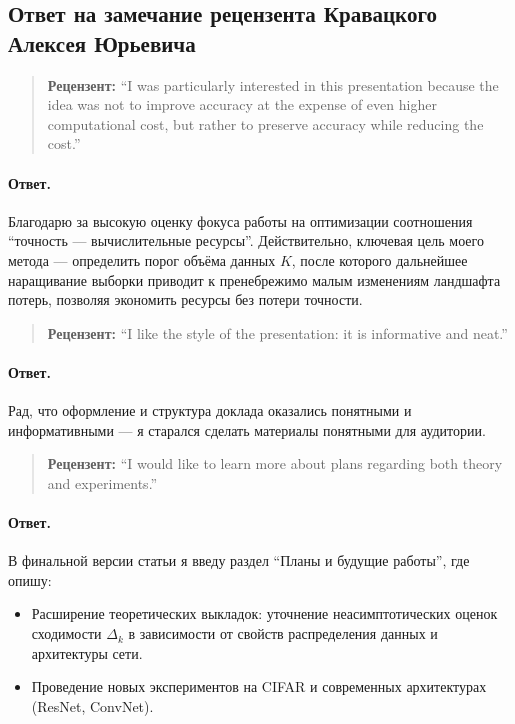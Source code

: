 \documentclass[11pt]{article}
\begin{document}
\pagestyle{empty}

\begin{center}
    \subsection*{Ответ на замечание рецензента Кравацкого Алексея Юрьевича}
\end{center}

\begin{quote}
    \textbf{Рецензент:}
    ``I was particularly interested in this presentation because the idea was not to improve accuracy at the expense of even
    higher computational cost, but rather to preserve accuracy while reducing the cost.''
\end{quote}

\paragraph{Ответ.}
Благодарю за высокую оценку фокуса работы на оптимизации соотношения ``точность --- вычислительные ресурсы''. Действительно,
ключевая цель моего метода — определить порог объёма данных $K$, после которого дальнейшее наращивание выборки приводит к
пренебрежимо малым изменениям ландшафта потерь, позволяя экономить ресурсы без потери точности.

\begin{quote}
    \textbf{Рецензент:}
    ``I like the style of the presentation: it is informative and neat.''
\end{quote}

\paragraph{Ответ.}
Рад, что оформление и структура доклада оказались понятными и информативными --- я старался сделать материалы понятными
для аудитории.

\begin{quote}
    \textbf{Рецензент:}
    ``I would like to learn more about plans regarding both theory and experiments.''
\end{quote}

\paragraph{Ответ.}
В финальной версии статьи я введу раздел ``Планы и будущие работы'', где опишу:
\begin{itemize}
    \item Расширение теоретических выкладок: уточнение неасимптотических оценок сходимости $\Delta_k$ в зависимости от
          свойств распределения данных и архитектуры сети.
    \item Проведение новых экспериментов на CIFAR и современных архитектурах (ResNet, ConvNet).
\end{itemize}
\end{document}
